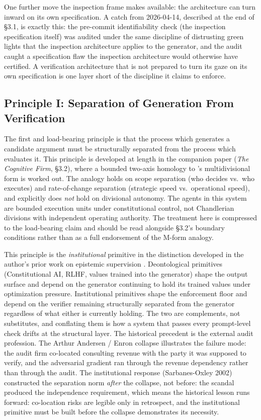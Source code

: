 \documentclass[11pt]{article}
\begin{document}
One further move the inspection frame makes available: the architecture can turn inward on its own specification. A catch from 2026-04-14, described at the end of \S3.1, is exactly this: the pre-commit identifiability check (the inspection specification itself) was audited under the same discipline of distrusting green lights that the inspection architecture applies to the generator, and the audit caught a specification flaw the inspection architecture would otherwise have certified. A verification architecture that is not prepared to turn its gaze on its own specification is one layer short of the discipline it claims to enforce.

\subsection{Principle I: Separation of Generation From Verification}

The first and load-bearing principle is that the process which generates a candidate argument must be structurally separated from the process which evaluates it. This principle is developed at length in the companion paper (\emph{The Cognitive Firm}, \S3.2), where a bounded two-axis homology to \citeauthor{chandler1962}'s multidivisional form is worked out. The analogy holds on scope separation (who decides vs.\ who executes) and rate-of-change separation (strategic speed vs.\ operational speed), and explicitly does \emph{not} hold on divisional autonomy. The agents in this system are bounded execution units under constitutional control, not Chandlerian divisions with independent operating authority. The treatment here is compressed to the load-bearing claim and should be read alongside \S3.2's boundary conditions rather than as a full endorsement of the M-form analogy.

This principle is the \emph{institutional} primitive in the distinction developed in the author's prior work on epistemic supervision \citep{alami2026c}. Deontological primitives (Constitutional AI, RLHF, values trained into the generator) shape the output surface and depend on the generator continuing to hold its trained values under optimization pressure. Institutional primitives shape the enforcement floor and depend on the verifier remaining structurally separated from the generator regardless of what either is currently holding. The two are complements, not substitutes, and conflating them is how a system that passes every prompt-level check drifts at the structural layer. The historical precedent is the external audit profession. The Arthur Andersen / Enron collapse illustrates the failure mode: the audit firm co-located consulting revenue with the party it was supposed to verify, and the adversarial gradient ran through the revenue dependency rather than through the audit. The institutional response (Sarbanes-Oxley 2002) constructed the separation norm \emph{after} the collapse, not before: the scandal produced the independence requirement, which means the historical lesson runs forward: co-location risks are legible only in retrospect, and the institutional primitive must be built before the collapse demonstrates its necessity.
\end{document}
